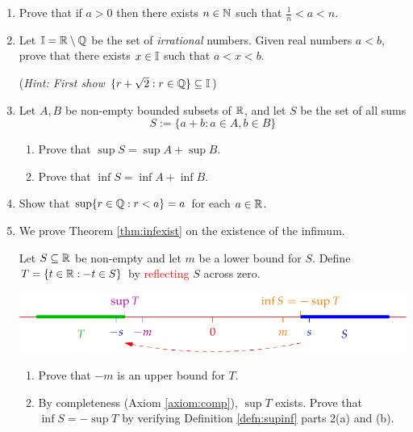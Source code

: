 \begin{exercisessec}{}{}
\begin{enumerate}
	  \item %
	  Prove that if $a>0$ then there exists $n\in\mathbb{N}$ such that $\frac 1n<a<n$.
	  
	
	  \item%
	  Let $\mathbb{I}=\mathbb{R}\setminus\mathbb{Q}$ be the set of \emph{irrational} numbers. Given real numbers $a<b$, prove that there exists $x\in\mathbb{I}$ such that $a<x<b$.\par
	  (\emph{Hint: First show $\{r+\sqrt 2:r\in\mathbb{Q}\}\subseteq\mathbb{I}$})
  

  	\item %
  	Let $A, B$ be non-empty bounded subsets of $\mathbb{R}$, and let $S$ be the set of all sums
  	\[S:=\{a+b:a\in A,b\in B\}\]
	  \begin{enumerate}
		  \item Prove that $\sup S=\sup A+\sup B$.
		  \item Prove that $\inf S=\inf A+\inf B$.
	  \end{enumerate}
  

  	\item%
  	Show that $\sup\{r\in \mathbb{Q}:r<a\}=a$ for each $a\in\mathbb{R}$.
  
  
  	\item\label{exs:infexist} We prove Theorem \ref{thm:infexist} on the existence of the infimum.\smallbreak
  
	  Let $S\subseteq\mathbb{R}$ be non-empty and let $m$ be a lower bound for $S$. Define $T=\{t\in\mathbb{R}:-t\in S\}$ by \textcolor{red}{reflecting} $S$ across zero.
		\begin{center}
			\includegraphics{infexist2}
		\end{center}

		\begin{enumerate}
		  \item Prove that $-m$ is an upper bound for $T$.
			\item By completeness (Axiom \ref{axiom:comp}), $\sup T$ exists. Prove that $\inf S=-\sup T$ by verifying Definition \ref{defn:supinf} parts 2(a) and (b).
		\end{enumerate}
  
	\end{enumerate}
\end{exercisessec}

\clearpage


